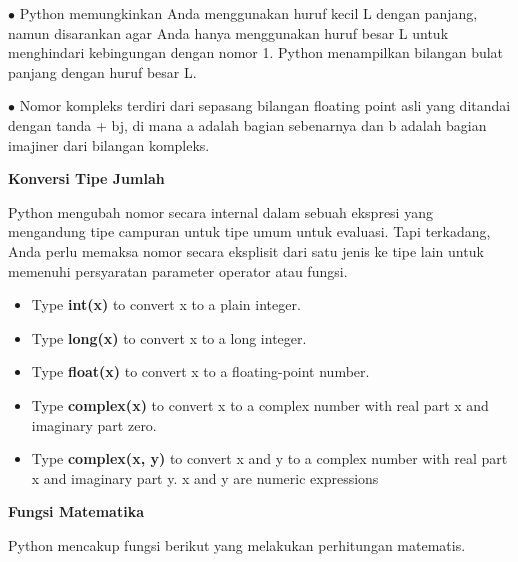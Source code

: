 \documentclass[a4paper,12pt]{report}
\begin{document}
\noindent 
 $ \bullet $ Python memungkinkan Anda menggunakan huruf kecil L dengan panjang, namun disarankan agar Anda hanya menggunakan huruf besar L untuk menghindari kebingungan dengan nomor 1. Python menampilkan bilangan bulat panjang dengan huruf besar L. \par
\noindent 
 $ \bullet $ Nomor kompleks terdiri dari sepasang bilangan floating point asli yang ditandai dengan tanda + bj, di mana a adalah bagian sebenarnya dan b adalah bagian imajiner dari bilangan kompleks. \par
\noindent 
\vspace{12pt}
\noindent 
\textbf{Konversi Tipe Jumlah} \par
\noindent 
\vspace{12pt}
\noindent 
Python mengubah nomor secara internal dalam sebuah ekspresi yang mengandung tipe campuran untuk tipe umum untuk evaluasi. Tapi terkadang, Anda perlu memaksa nomor secara eksplisit dari satu jenis ke tipe lain untuk memenuhi persyaratan parameter operator atau fungsi. \par
\noindent 
\vspace{12pt}
\noindent 
\begin{itemize}
\item Type \textbf{int(x)} to convert x to a plain integer. \par
\noindent 
\item Type \textbf{long(x)} to convert x to a long integer. \par
\noindent 
\item Type \textbf{float(x)} to convert x to a floating-point number. \par
\noindent 
\item Type \textbf{complex(x)} to convert x to a complex number with real part x and imaginary part zero. \par
\noindent 
\item Type \textbf{complex(x, y)} to convert x and y to a complex number with real part x and imaginary part y. x and y are numeric expressions\end{itemize}
 \par
\noindent 
\vspace{12pt}
\noindent 
\textbf{Fungsi Matematika} \par
\noindent 
\vspace{12pt}
\noindent 
Python mencakup fungsi berikut yang melakukan perhitungan matematis. \par
\noindent 
\vspace{12pt}
\end{document}
